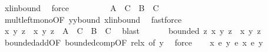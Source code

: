 \begin{isabellebody}
\ x{\isacharprime}{\kern0pt}{\isacharunderscore}{\kern0pt}lin{\isacharunderscore}{\kern0pt}bound\ \isamarkupfalse%
\ force\isanewline
\ \ \ \ \isamarkupfalse%
\ \isamarkupfalse%
\ {\isachardoublequoteopen}{\isachardot}{\kern0pt}{\isachardot}{\kern0pt}{\isachardot}{\kern0pt}\ {\isasymle}\ A\ {\isacharasterisk}{\kern0pt}\ C{\isacharprime}{\kern0pt}\ {\isacharplus}{\kern0pt}\ B\ {\isacharplus}{\kern0pt}\ C{\isachardoublequoteclose}\ \isamarkupfalse%
\ mult{\isacharunderscore}{\kern0pt}left{\isacharunderscore}{\kern0pt}mono{\isacharbrackleft}{\kern0pt}OF\ y{\isacharunderscore}{\kern0pt}y{\isacharprime}{\kern0pt}{\isacharunderscore}{\kern0pt}bound\ x{\isacharprime}{\kern0pt}{\isacharunderscore}{\kern0pt}lin{\isacharunderscore}{\kern0pt}bound{\isacharparenleft}{\kern0pt}{}{\isacharparenright}{\kern0pt}{\isacharbrackright}{\kern0pt}\ \isamarkupfalse%
\ fastforce\isanewline
\ \ \ \ \isamarkupfalse%
\ \isamarkupfalse%
\ {\isachardoublequoteopen}{\isasymbar}x{\isacharprime}{\kern0pt}\ {\isacharparenleft}{\kern0pt}y\ z{\isacharparenright}{\kern0pt}\ {\isacharminus}{\kern0pt}\ x{\isacharprime}{\kern0pt}\ {\isacharparenleft}{\kern0pt}y{\isacharprime}{\kern0pt}\ z{\isacharparenright}{\kern0pt}{\isasymbar}\ {\isasymle}\ A\ {\isacharasterisk}{\kern0pt}\ C{\isacharprime}{\kern0pt}\ {\isacharplus}{\kern0pt}\ B\ {\isacharplus}{\kern0pt}\ C{\isachardoublequoteclose}\ \isamarkupfalse%
\ blast\isanewline
\ \ \isamarkupfalse%
\isanewline
\ \ \isamarkupfalse%
\ {\isachardoublequoteopen}bounded\ {\isacharparenleft}{\kern0pt}{\isasymlambda}z{\isachardot}{\kern0pt}\ x\ {\isacharparenleft}{\kern0pt}y\ z{\isacharparenright}{\kern0pt}\ {\isacharminus}{\kern0pt}\ x{\isacharprime}{\kern0pt}\ {\isacharparenleft}{\kern0pt}y{\isacharprime}{\kern0pt}\ z{\isacharparenright}{\kern0pt}{\isacharparenright}{\kern0pt}{\isachardoublequoteclose}\ \isamarkupfalse%
\ bounded{\isacharunderscore}{\kern0pt}add{\isacharbrackleft}{\kern0pt}OF\ bounded{\isacharunderscore}{\kern0pt}comp{\isacharparenleft}{\kern0pt}{}{\isacharparenright}{\kern0pt}{\isacharbrackleft}{\kern0pt}OF\ rel{\isacharunderscore}{\kern0pt}x{\isacharparenleft}{\kern0pt}{}{\isacharparenright}{\kern0pt}{\isacharcomma}{\kern0pt}\ of\ y{\isacharbrackright}{\kern0pt}{\isacharbrackright}{\kern0pt}\ \isamarkupfalse%
\ force\isanewline
\ \ \isamarkupfalse%
\ {\isachardoublequoteopen}{\isacharparenleft}{\kern0pt}x\ {\isacharasterisk}{\kern0pt}\isactrlsub e\ y{\isacharparenright}{\kern0pt}\ {\isasymsim}\isactrlsub e\ {\isacharparenleft}{\kern0pt}x{\isacharprime}{\kern0pt}\ {\isacharasterisk}{\kern0pt}\isactrlsub e\ y{\isacharprime}{\kern0pt}{\isacharparenright}{\kern0pt}{\isachardoublequoteclose}\ \isamarkupfalse%

\end{isabellebody}

